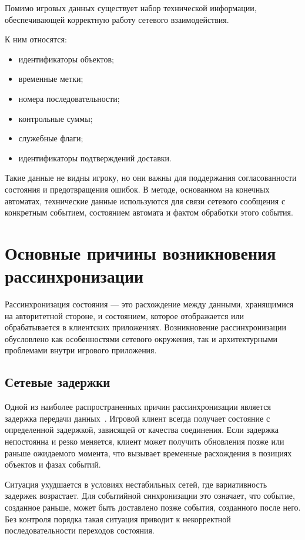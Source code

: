 Помимо игровых данных существует набор технической информации, обеспечивающей корректную работу сетевого взаимодействия.

К ним относятся:
\begin{itemize}
	\item идентификаторы объектов;
	\item временные метки;
	\item номера последовательности;
	\item контрольные суммы;
	\item служебные флаги;
	\item идентификаторы подтверждений доставки.
\end{itemize}

Такие данные не видны игроку, но они важны для поддержания согласованности состояния и предотвращения ошибок. В методе, основанном на конечных автоматах, технические данные используются для связи сетевого сообщения с конкретным событием, состоянием автомата и фактом обработки этого события.

\section{Основные причины возникновения рассинхронизации}

Рассинхронизация состояния --- это расхождение между данными, хранящимися на авторитетной стороне, и состоянием, которое отображается или обрабатывается в клиентских приложениях. Возникновение рассинхронизации обусловлено как особенностями сетевого окружения, так и архитектурными проблемами внутри игрового приложения.

\subsection{Сетевые задержки}

Одной из наиболее распространенных причин рассинхронизации является задержка передачи данных~\cite{pantel2002lag}. Игровой клиент всегда получает состояние с определенной задержкой, зависящей от качества соединения. Если задержка непостоянна и резко меняется, клиент может получить обновления позже или раньше ожидаемого момента, что вызывает временные расхождения в позициях объектов и фазах событий.

Ситуация ухудшается в условиях нестабильных сетей, где вариативность задержек возрастает. Для событийной синхронизации это означает, что событие, созданное раньше, может быть доставлено позже события, созданного после него. Без контроля порядка такая ситуация приводит к некорректной последовательности переходов состояния.

